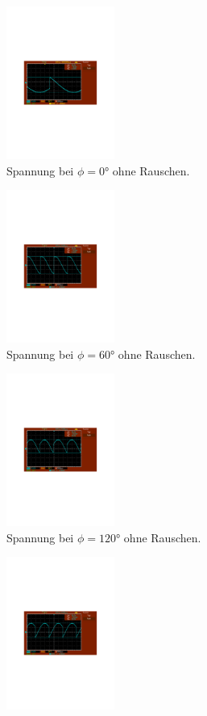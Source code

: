 \begin{figure}
  \label{fig:ohne}
  \begin{subfigure}{0.48\textwidth}
      \centering
      \includegraphics[height=5cm]{content/abbildungen/ohne/0.pdf}
      \caption{Spannung bei $\phi = 0°$ ohne Rauschen.}
  \end{subfigure}
\hfill 
  \begin{subfigure}{0.48\textwidth}
      \centering
      \includegraphics[height=5cm]{content/abbildungen/ohne/60.pdf}
      \caption{Spannung bei $\phi = 60°$ ohne Rauschen.}
  \end{subfigure}
\hfill 
  \begin{subfigure}{0.48\textwidth}
      \centering
      \includegraphics[height=5cm]{content/abbildungen/ohne/120.pdf}
      \caption{Spannung bei $\phi = 120°$ ohne Rauschen.}
  \end{subfigure}
\hfill 
  \begin{subfigure}{0.48\textwidth}
      \centering
      \includegraphics[height=5cm]{content/abbildungen/ohne/180.pdf}

\end{subfigure}
\end{figure}
